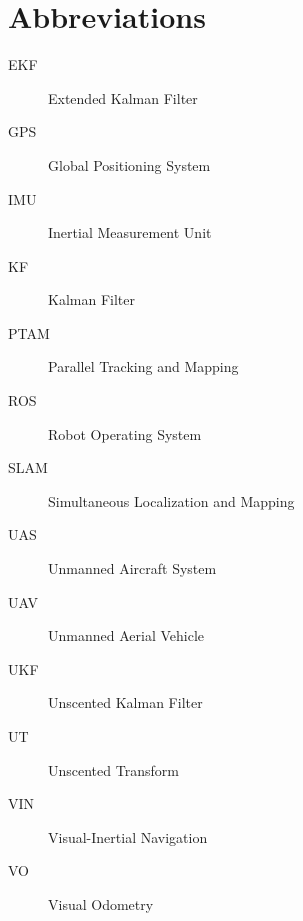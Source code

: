 \chapter*{Abbreviations}

\begin{description}
\item [EKF] Extended Kalman Filter
\item [GPS] Global Positioning System
\item [IMU] Inertial Measurement Unit
\item [KF] Kalman Filter
\item [PTAM] Parallel Tracking and Mapping
\item [ROS] Robot Operating System
\item [SLAM] Simultaneous Localization and Mapping
\item [UAS] Unmanned Aircraft System
\item [UAV] Unmanned Aerial Vehicle
\item [UKF] Unscented Kalman Filter
\item [UT] Unscented Transform
\item [VIN] Visual-Inertial Navigation
\item [VO] Visual Odometry
\end{description}